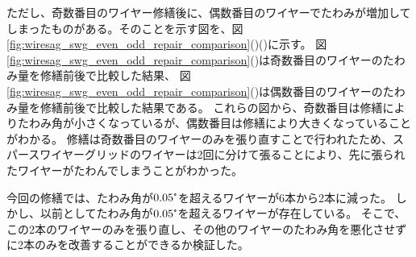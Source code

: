 \documentclass[../../main.tex]{subfiles}
\begin{document}
ただし、奇数番目のワイヤー修繕後に、偶数番目のワイヤーでたわみが増加してしまったものがある。そのことを示す図を、図\ref{fig:wiresag_swg_even_odd_repair_comparison}()()に示す。
図\ref{fig:wiresag_swg_even_odd_repair_comparison}()は奇数番目のワイヤーのたわみ量を修繕前後で比較した結果、
図\ref{fig:wiresag_swg_even_odd_repair_comparison}()は偶数番目のワイヤーのたわみ量を修繕前後で比較した結果である。
これらの図から、奇数番目は修繕によりたわみ角が小さくなっているが、偶数番目は修繕により大きくなっていることがわかる。
修繕は奇数番目のワイヤーのみを張り直すことで行われたため、スパースワイヤーグリッドのワイヤーは2回に分けて張ることにより、先に張られたワイヤーがたわんでしまうことがわかった。

今回の修繕では、たわみ角が$0.05\tcdegree$を超えるワイヤーが6本から2本に減った。
しかし、以前としてたわみ角が$0.05\tcdegree$を超えるワイヤーが存在している。
そこで、この2本のワイヤーのみを張り直し、その他のワイヤーのたわみ角を悪化させずに2本のみを改善することができるか検証した。
\end{document}
